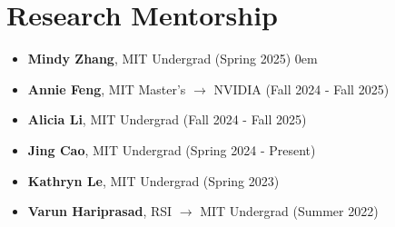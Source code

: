 \section{Research Mentorship}

\begin{itemize}
    \item \textbf{Mindy Zhang}, MIT Undergrad (Spring 2025)
    \itemsep0em 
    \item \textbf{Annie Feng}, MIT Master's $\rightarrow$ NVIDIA (Fall 2024 - Fall 2025)
    \item \textbf{Alicia Li}, MIT Undergrad (Fall 2024 - Fall 2025)
    \item \textbf{Jing Cao}, MIT Undergrad (Spring 2024 - Present)
    \item \textbf{Kathryn Le}, MIT Undergrad (Spring 2023)
    \item \textbf{Varun Hariprasad}, RSI $\rightarrow$ MIT Undergrad (Summer 2022)
\end{itemize}








